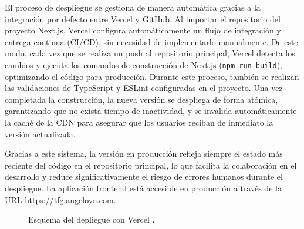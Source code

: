 El proceso de despliegue se gestiona de manera automática gracias a la integración por defecto entre Vercel y GitHub. Al importar el repositorio del proyecto Next.js, Vercel configura automáticamente un flujo de integración y entrega continua (CI/CD), sin necesidad de implementarlo manualmente. De este modo, cada vez que se realiza un push al repositorio principal, Vercel detecta los cambios y ejecuta los comandos de construcción de Next.js (\texttt{npm run build}), optimizando el código para producción. Durante este proceso, también se realizan las validaciones de TypeScript y ESLint configuradas en el proyecto. Una vez completada la construcción, la nueva versión se despliega de forma atómica, garantizando que no exista tiempo de inactividad, y se invalida automáticamente la caché de la CDN para asegurar que los usuarios reciban de inmediato la versión actualizada.

Gracias a este sistema, la versión en producción refleja siempre el estado más reciente del código en el repositorio principal, lo que facilita la colaboración en el desarrollo y reduce significativamente el riesgo de errores humanos durante el despliegue. La aplicación frontend está accesible en producción a través de la URL \url{https://tfg.angeloyo.com}.


\begin{figure}[H]
  \centering
  \caption{Esquema del depliegue con Vercel \cite{cicdfoto}.}
  \label{fig:cicd}
\end{figure}
